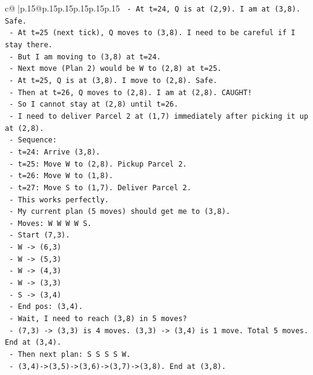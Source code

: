 \documentclass{article}
\begin{document}
{\begin{supertabular}{c@{$\;$}|p{.15\linewidth}@{}p{.15\linewidth}p{.15\linewidth}p{.15\linewidth}p{.15\linewidth}p{.15\linewidth}}
{{{\texttt{      {-} At t=24, Q is at (2,9). I am at (3,8). Safe.} \\
\texttt{      {-} At t=25 (next tick), Q moves to (3,8). I need to be careful if I stay there.} \\
\texttt{      {-} But I am moving to (3,8) at t=24.} \\
\texttt{      {-} Next move (Plan 2) would be W to (2,8) at t=25.} \\
\texttt{      {-} At t=25, Q is at (3,8). I move to (2,8). Safe.} \\
\texttt{      {-} Then at t=26, Q moves to (2,8). I am at (2,8). CAUGHT!} \\
\texttt{      {-} So I cannot stay at (2,8) until t=26.} \\
\texttt{      {-} I need to deliver Parcel 2 at (1,7) immediately after picking it up at (2,8).} \\
\texttt{      {-} Sequence:} \\
\texttt{        {-} t=24: Arrive (3,8).} \\
\texttt{        {-} t=25: Move W to (2,8). Pickup Parcel 2.} \\
\texttt{        {-} t=26: Move W to (1,8).} \\
\texttt{        {-} t=27: Move S to (1,7). Deliver Parcel 2.} \\
\texttt{      {-} This works perfectly.} \\
\texttt{      {-} My current plan (5 moves) should get me to (3,8).} \\
\texttt{      {-} Moves: W W W W S.} \\
\texttt{      {-} Start (7,3).} \\
\texttt{      {-} W {-}> (6,3)} \\
\texttt{      {-} W {-}> (5,3)} \\
\texttt{      {-} W {-}> (4,3)} \\
\texttt{      {-} W {-}> (3,3)} \\
\texttt{      {-} S {-}> (3,4)} \\
\texttt{      {-} End pos: (3,4).} \\
\texttt{      {-} Wait, I need to reach (3,8) in 5 moves?} \\
\texttt{      {-} (7,3) {-}> (3,3) is 4 moves. (3,3) {-}> (3,4) is 1 move. Total 5 moves. End at (3,4).} \\
\texttt{      {-} Then next plan: S S S S W.} \\
\texttt{        {-} (3,4){-}>(3,5){-}>(3,6){-}>(3,7){-}>(3,8). End at (3,8).} \\
}}}
\end{supertabular}}
\end{document}
